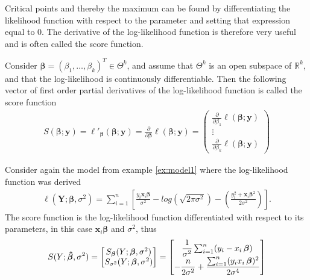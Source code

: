 Critical points and thereby the maximum can be found by differentiating the likelihood function with respect to the parameter and setting that expression equal to 0. The derivative of the log-likelihood function is therefore very useful and is often called the score function. 
\begin{definition}
\label{def:score_function}
Consider $\boldsymbol{\beta} = (\beta_1, \ldots, \beta_k)^T \in \Theta^k$, and assume that $\Theta^k$ is an open subspace of $\mathbb{R}^k$, and that the log-likelihood is continuously differentiable. Then the following vector of first order partial derivatives of the log-likelihood function is called the score function
\begin{align*}
    S(\boldsymbol{\beta}; \textbf{y}) = \ell'_{\boldsymbol{\beta}}(\boldsymbol{\beta}; \textbf{y}) = \frac{\partial}{\partial \boldsymbol{\beta}} \ell (\boldsymbol{\beta}; \textbf{y}) = 
    \begin{pmatrix}
        \frac{\partial}{\partial \beta_1}\ell (\boldsymbol{\beta}; \textbf{y}) \\
        \vdots \\
        \frac{\partial}{\partial \beta_k}\ell (\boldsymbol{\beta}; \textbf{y})
    \end{pmatrix}
\end{align*}
\end{definition}
\begin{example}
Consider again the model from example \ref{ex:model1} where the log-likelihood function was derived
\begin{align*}
   \ell(\textbf{Y};\boldsymbol{\beta}, \sigma^2) = \sum_{i = 1}^n \left[\frac{y_i \textbf{x}_i\boldsymbol{\beta}}{\sigma^2} - log\left( \sqrt{2 \pi \sigma^2}\right) - \left( \frac{y_i^2 + \textbf{x}_i\boldsymbol{\beta}^2}{2\sigma^2} \right) \right].
\end{align*}
The score function is the log-likelihood function differentiated with respect to its parameters, in this case $\textbf{x}_i\boldsymbol{\beta}$ and $\sigma^2$, thus
\begin{align*}
    S(Y; \operatorname{\boldsymbol{\hat{\beta}}}, \sigma^2) = 
    \begin{bmatrix}
        S_{\operatorname{\boldsymbol{\beta}}} (Y; \operatorname{\boldsymbol{\beta}}, \sigma^2) \\
        S_{\sigma^2}(Y; \operatorname{\boldsymbol{\beta}}, \sigma^2)
    \end{bmatrix}
    =
    \begin{bmatrix}
        \dfrac{1}{\sigma^2} \sum_{i=1}^n (y_i - x_i \operatorname{\boldsymbol{\beta}}) \\
        - \dfrac{n}{2 \sigma^2} + \dfrac{\sum_{i=1}^n (y_i x_i \operatorname{\boldsymbol{\beta}})^2}{2 \sigma^4}
    \end{bmatrix}
\end{align*}
\end{example}
